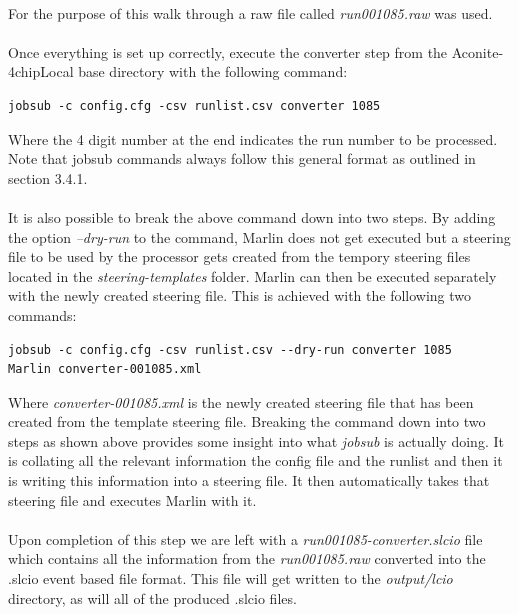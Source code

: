 \documentclass[11pt]{article}
\begin{document}
\paragraph{}
For the purpose of this walk through a raw file called \textit{run001085.raw} was used.
\paragraph{}
Once everything is set up correctly, execute the converter step from the Aconite-4chipLocal base directory with the following command:
\begin{verbatim}
jobsub -c config.cfg -csv runlist.csv converter 1085
\end{verbatim}
Where the 4 digit number at the end indicates the run number to be processed. Note that jobsub commands always follow this general format as outlined in section 3.4.1.
\paragraph{}
It is also possible to break the above command down into two steps. By adding the option \textit{--dry-run} to the command, Marlin does not get executed but a steering file to be used by the processor gets created from the tempory steering files located in the \textit{steering-templates} folder. Marlin can then be executed separately with the newly created steering file. This is achieved with the following two commands:
\begin{verbatim}
jobsub -c config.cfg -csv runlist.csv --dry-run converter 1085
Marlin converter-001085.xml
\end{verbatim}
Where \textit{converter-001085.xml} is the newly created steering file that has been created from the template steering file. Breaking the command down into two steps as shown above provides some insight into what \textit{jobsub} is actually doing. It is collating all the relevant information the config file and the runlist and then it is writing this information into a steering file. It then automatically takes that steering file and executes Marlin with it.
\paragraph{}
Upon completion of this step we are left with a \textit{run001085-converter.slcio} file which contains all the information from the \textit{run001085.raw} converted into the .slcio event based file format. This file will get written to the \textit{output/lcio} directory, as will all of the produced .slcio files.
\end{document}
